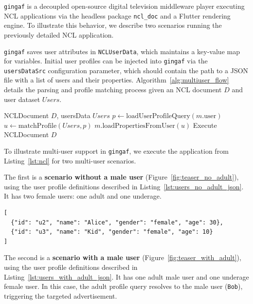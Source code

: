 \documentclass[sigconf,authorversion,review,authordraft]{webmedia}
\begin{document}
\texttt{gingaf} is a decoupled open-source digital television middleware player executing NCL applications via the headless package \texttt{ncl\_doc} and a Flutter rendering engine. To illustrate this behavior, we describe two scenarios running the previously detailed NCL application.

\texttt{gingaf} saves user attributes in \texttt{NCLUserData}, which maintains a key-value map for variables. Initial user profiles can be injected into \texttt{gingaf} via the \texttt{usersDataSrc} configuration parameter, which should contain the path to a JSON file with a list of users and their properties. Algorithm~\ref{alg:multiuser_flow} details the parsing and profile matching process given an NCL document $D$ and user dataset $Users$.

\begin{algorithm}
  \caption{User Profile Properties Parsing}
  \label{alg:multiuser_flow}
  \renewcommand{\algorithmicrequire}{\textbf{input:}}
  \begin{algorithmic}[1]
    \Require NCLDocument $D$, usersData $Users$
    \State $p \gets \text{loadUserProfileQuery}(m.\text{user})$
    \State $u \gets \text{matchProfile}(Users, p)$
    \State $m.\text{loadPropertiesFromUser}(u)$
    \EndFor
    \State Execute NCLDocument $D$
  \end{algorithmic}
\end{algorithm}

To illustrate multi-user support in \texttt{gingaf}, we execute the application from Listing~\ref{lst:ncl} for two multi-user scenarios.

The first is a \textbf{scenario without a male user} (Figure~\ref{fig:teaser_no_adult}), using the user profile definitions described in Listing~\ref{lst:users_no_adult_json}. It has two female users: one adult and one underage.

\begin{lstlisting}[caption={\texttt{users\_data\_no\_adult\_male.json}}, basicstyle=\footnotesize\ttfamily, label={lst:users_no_adult_json}]
[
  {"id": "u2", "name": "Alice", "gender": "female", "age": 30},
  {"id": "u3", "name": "Kid", "gender": "female", "age": 10}
]
\end{lstlisting}

The second is a \textbf{scenario with a male user} (Figure~\ref{fig:teaser_with_adult}), using the user profile definitions described in Listing~\ref{lst:users_with_adult_json}. It has one adult male user and one underage female user. In this case, the adult profile query resolves to the male user (\texttt{Bob}), triggering the targeted advertisement.
\end{document}
